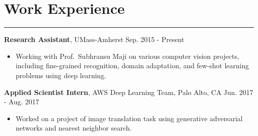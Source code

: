 \documentclass[10pt,letterpaper]{article}
\begin{document}

					
\section*{Work Experience} \vspace{-8pt}
\hrule \vspace{10pt}
{\bf Research Assistant}, UMass-Amherst \hfill Sep. 2015 - Present
\begin{itemize}
\item Working with Prof.~Subhransu Maji on various computer vision projects, including fine-grained recognition, domain adaptation, and few-shot learning problems using deep learning.
\end{itemize}
\vspace{5pt}

\noindent 
{\bf Applied Scientist Intern}, AWS Deep Learning Team, Palo Alto, CA \hfill Jun. 2017 - Aug. 2017
\begin{itemize}
\item Worked on a project of image translation task using generative adversarial networks and nearest neighbor search.
\end{itemize}
\vspace{5pt}
\end{document}
